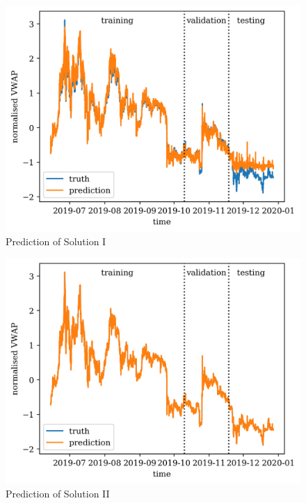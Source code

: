 \documentclass[12pt, letterpaper]{article}
\begin{document}
\begin{figure}
    \centering
    \includegraphics{figures/pred_lstm.png}
    \caption{Prediction of Solution I}%
    \label{fig:pred1}
\end{figure}

\begin{figure}
    \centering
    \includegraphics{figures/pred_lstmratio.png}
    \caption{Prediction of Solution II}%
    \label{fig:pred2}
\end{figure}

\end{document}
